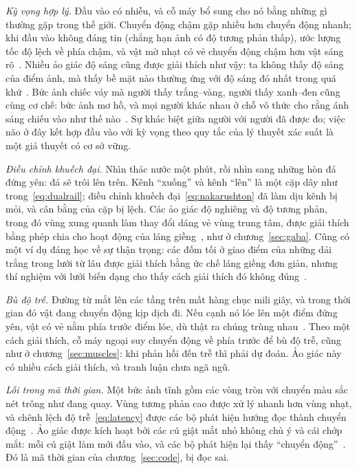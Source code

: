 \emph{Kỳ vọng hợp lý.} Đầu vào có nhiễu, và cỗ máy bổ sung cho nó bằng những gì thường gặp trong thế giới. Chuyển động chậm gặp nhiều hơn chuyển động nhanh; khi đầu vào không đáng tin (chẳng hạn ảnh có độ tương phản thấp), ước lượng tốc độ lệch về phía chậm, và vật mờ nhạt có vẻ chuyển động chậm hơn vật sáng rõ~\cite{Weiss2002}. Nhiều ảo giác độ sáng cũng được giải thích như vậy: ta không thấy độ sáng của điểm ảnh, mà thấy bề mặt nào thường ứng với độ sáng đó nhất trong quá khứ~\cite{Purves2011}. Bức ảnh chiếc váy mà người thấy trắng--vàng, người thấy xanh--đen cũng cùng cơ chế: bức ảnh mơ hồ, và mọi người khác nhau ở chỗ vô thức cho rằng ánh sáng chiếu vào như thế nào~\cite{LaferSousa2015,Wallisch2017}. Sự khác biệt giữa người với người đã được đo; việc não ở đây kết hợp đầu vào với kỳ vọng theo quy tắc của lý thuyết xác suất là một giả thuyết có cơ sở vững.

\emph{Điều chỉnh khuếch đại.} Nhìn thác nước một phút, rồi nhìn sang những hòn đá đứng yên: đá sẽ trôi lên trên. Kênh ``xuống'' và kênh ``lên'' là một cặp dây như trong~\eqref{eq:dualrail}; điều chỉnh khuếch đại~\eqref{eq:nakarushton} đã làm dịu kênh bị mỏi, và cân bằng của cặp bị lệch. Các ảo giác độ nghiêng và độ tương phản, trong đó vùng xung quanh làm thay đổi dáng vẻ vùng trung tâm, được giải thích bằng phép chia cho hoạt động của láng giềng~\cite{Schwartz2009}, như ở chương~\ref{sec:gaba}. Cũng có một ví dụ đáng học về sự thận trọng: các đốm tối ở giao điểm của những dải trắng trong lưới từ lâu được giải thích bằng ức chế láng giềng đơn giản, nhưng thí nghiệm với lưới biến dạng cho thấy cách giải thích đó không đúng~\cite{SchillerCarvey2005}.

\emph{Bù độ trễ.} Đường từ mắt lên các tầng trên mất hàng chục mili giây, và trong thời gian đó vật đang chuyển động kịp dịch đi. Nếu cạnh nó lóe lên một điểm đứng yên, vật có vẻ nằm phía trước điểm lóe, dù thật ra chúng trùng nhau~\cite{Nijhawan1994}. Theo một cách giải thích, cỗ máy ngoại suy chuyển động về phía trước để bù độ trễ, cũng như ở chương~\ref{sec:muscles}: khi phản hồi đến trễ thì phải dự đoán. Ảo giác này có nhiều cách giải thích, và tranh luận chưa ngã ngũ.

\emph{Lỗi trong mã thời gian.} Một bức ảnh tĩnh gồm các vòng tròn với chuyển màu sắc nét trông như đang quay. Vùng tương phản cao được xử lý nhanh hơn vùng nhạt, và chênh lệch độ trễ~\eqref{eq:latency} được các bộ phát hiện hướng đọc thành chuyển động~\cite{Conway2005}. Ảo giác được kích hoạt bởi các cú giật mắt nhỏ không chủ ý và cái chớp mắt: mỗi cú giật làm mới đầu vào, và các bộ phát hiện lại thấy ``chuyển động''~\cite{OteroMillan2012}. Đó là mã thời gian của chương~\ref{sec:code}, bị đọc sai.


